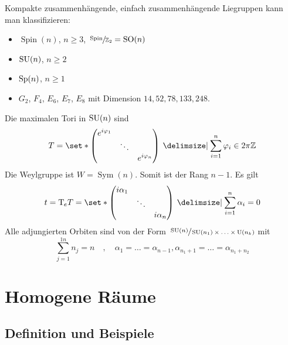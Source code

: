 \begin{bemerkung*}[{name=[Klassifikation kompakter zusammenhängender einfach-zusammenhängender Liegruppen]}]
	Kompakte zusammenhängende, einfach zusammenhängende Liegruppen kann man klassifizieren: 
	\begin{itemize}
		\item $\operatorname{Spin}(n)$, $n \ge 3$, $\sfrac{\operatorname{Spin}}{\mathbb{Z}_2} = \operatorname{SO}(n)$
		\item $\operatorname{SU}(n)$, $n \ge 2$
		\item $\operatorname{Sp}(n)$, $n \ge 1$
		\item $G_2$, $F_4$, $E_6$, $E_7$, $E_8$ mit Dimension $14,52,78,133,248$.
	\end{itemize}
\end{bemerkung*}

\begin{beispiel*}[{name=[maximale Tori der speziellen unitären Gruppe]}]
	Die maximalen Tori in $\operatorname{SU}(n)$ sind 
	\[
		T = \set*{\begin{pmatrix}
			e^{i \varphi_1} & & \\
			& \ddots & \\
			& & e^{i \varphi_n}
		\end{pmatrix} \given \sum_{i=1}^{n} \varphi_i \in 2 \pi \mathbb{Z}}
	\]
	Die Weylgruppe ist $W = \operatorname{Sym}(n)$. Somit ist der Rang $n-1$.
	Es gilt 
	\[
		t = \Tmap_e T = \set*{ \begin{pmatrix}
			i \alpha_1 & & \\
			& \ddots & \\
			& & i \alpha_n
		\end{pmatrix} \given \sum_{i=1}^{n} \alpha_i = 0}
	\]
	Alle adjungierten Orbiten sind von der Form $\sfrac{\operatorname{SU}(n)}{\operatorname{SU}(n_1) \times \ldots \times \operatorname{U}(n_k)}$ mit
	\[
		\sum_{j=1}^{1n} n_j = n \quad , \quad \alpha_1 = \ldots = \alpha_{n-1}, \alpha_{n_1 +1} = \ldots = \alpha_{n_1 +n_2}
	\]
\end{beispiel*}






\chapter{Homogene Räume} %
\label{cha:3}

\section{Definition und Beispiele} %
\label{sec:31}

